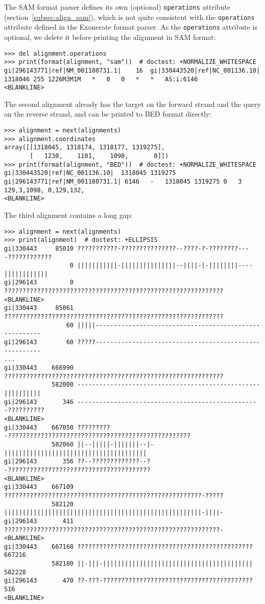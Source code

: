 The SAM format parser defines its own (optional) \verb|operations| attribute (section~\ref{subsec:align_sam}), which is not quite consistent with the \verb|operations| attribute defined in the Exonerate format parser. As the \verb|operations| attribute is optional, we delete it before printing the alignment in SAM format:
\begin{verbatim}
>>> del alignment.operations
>>> print(format(alignment, "sam"))  # doctest: +NORMALIZE_WHITESPACE
gi|296143771|ref|NM_001180731.1|	16	gi|330443520|ref|NC_001136.10|	1318046	255	1226M3M1M	*	0	0	*	*	AS:i:6146
<BLANKLINE>
\end{verbatim}

The second alignment already has the target on the forward strand and the query on the reverse strand, and can be printed to BED format directly:
\begin{verbatim}
>>> alignment = next(alignments)
>>> alignment.coordinates
array([[1318045, 1318174, 1318177, 1319275],
       [   1230,    1101,    1098,       0]])
>>> print(format(alignment, "BED"))  # doctest: +NORMALIZE_WHITESPACE
gi|330443520|ref|NC_001136.10|	1318045	1319275	gi|296143771|ref|NM_001180731.1| 6146	-	1318045	1319275	0	3	129,3,1098,	0,129,132,
<BLANKLINE>
\end{verbatim}
The third alignment contains a long gap:
\begin{verbatim}
>>> alignment = next(alignments)
>>> print(alignment)  # doctest: +ELLIPSIS
gi|330443     85010 ???????????-???????????????--????-?-????????----????????????
                  0 |||||||||||-|||||||||||||||--||||-|-||||||||----||||||||||||
gi|296143         0 ????????????????????????????????????????????????????????????
<BLANKLINE>
gi|330443     85061 ????????????????????????????????????????????????????????????
                 60 |||||-------------------------------------------------------
gi|296143        60 ?????-------------------------------------------------------
...
gi|330443    666990 ????????????????????????????????????????????????????????????
             582000 --------------------------------------------------||||||||||
gi|296143       346 --------------------------------------------------??????????
<BLANKLINE>
gi|330443    667050 ?????????-??????????????????????????????????????????????????
             582060 ||--|||||-|||||||--|-|||||||||||||||||||||||||||||||||||||||
gi|296143       356 ??--?????????????--?-???????????????????????????????????????
<BLANKLINE>
gi|330443    667109 ??????????????????????????????????????????????????????-?????
             582120 ||||||||||||||||||||||||||||||||||||||||||||||||||||||-||||-
gi|296143       411 ???????????????????????????????????????????????????????????-
<BLANKLINE>
gi|330443    667168 ???????????????????????????????????????????????? 667216
             582180 ||-|||-||||||||||||||||||||||||||||||||||||||||| 582228
gi|296143       470 ??-???-?????????????????????????????????????????    516
<BLANKLINE>
\end{verbatim}

